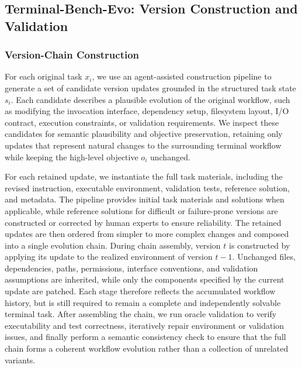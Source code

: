 \documentclass{llmxive}
\begin{document}
\subsection{Terminal-Bench-Evo: Version Construction and Validation}
\label{app:terminal_validation}

\subsubsection{Version-Chain Construction}
\label{app:terminal_version_construction}
For each original task $x_i$, we use an agent-assisted construction pipeline to generate a set of candidate version updates grounded in the structured task state $s_i$. Each candidate describes a plausible evolution of the original workflow, such as modifying the invocation interface, dependency setup, filesystem layout, I/O contract, execution constraints, or validation requirements. We inspect these candidates for semantic plausibility and objective preservation, retaining only updates that represent natural changes to the surrounding terminal workflow while keeping the high-level objective $o_i$ unchanged.

For each retained update, we instantiate the full task materials, including the revised instruction, executable environment, validation tests, reference solution, and metadata. The pipeline provides initial task materials and solutions when applicable, while reference solutions for difficult or failure-prone versions are constructed or corrected by human experts to ensure reliability. The retained updates are then ordered from simpler to more complex changes and composed into a single evolution chain. During chain assembly, version $t$ is constructed by applying its update to the realized environment of version $t-1$. Unchanged files, dependencies, paths, permissions, interface conventions, and validation assumptions are inherited, while only the components specified by the current update are patched. Each stage therefore reflects the accumulated workflow history, but is still required to remain a complete and independently solvable terminal task. After assembling the chain, we run oracle validation to verify executability and test correctness, iteratively repair environment or validation issues, and finally perform a semantic consistency check to ensure that the full chain forms a coherent workflow evolution rather than a collection of unrelated variants.
\end{document}
